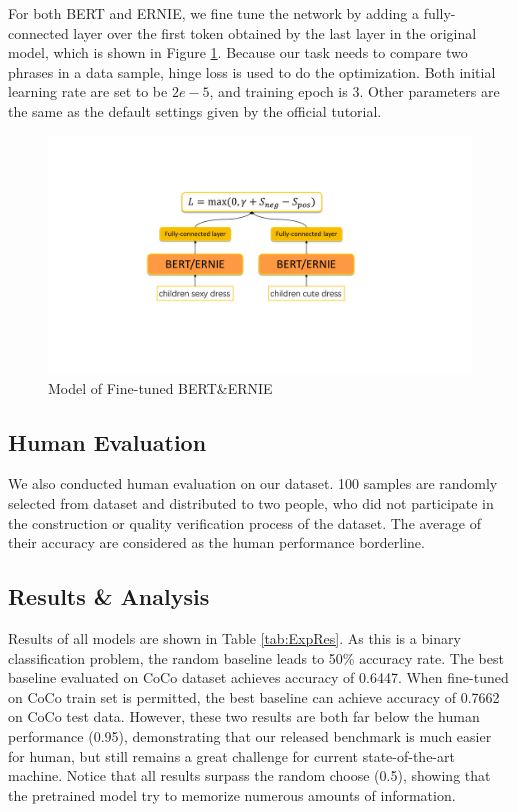 For both BERT and ERNIE, we fine tune the network by adding a fully-connected layer over the first token obtained by the last layer in the original model, which is shown in Figure \ref{fig:tuneNet}. Because our task needs to compare two phrases in a data sample, hinge loss is used to do the optimization. Both initial learning rate are set to be $2e-5$, and training epoch is 3. Other parameters are the same as the default settings given by the official tutorial.

\begin{figure}[h!]
	\centering
	\includegraphics[width=0.8\columnwidth]{images/fineTuneNetwork.pdf}
	\caption{Model of Fine-tuned BERT\&ERNIE}
	\label{fig:tuneNet}
\end{figure}


\subsection{Human Evaluation}
We also conducted human evaluation on our dataset. 100 samples are randomly selected from dataset and distributed to two people, who did not participate in the construction or quality verification process of the dataset. The average of their accuracy are considered as the human performance borderline. 




\subsection{Results \& Analysis}
Results of all models are shown in Table \ref{tab:ExpRes}. As this is a binary classification problem, the random baseline leads to 50\% accuracy rate. 
The best baseline evaluated on CoCo dataset achieves accuracy of 0.6447. When fine-tuned on CoCo train set is permitted, the best baseline can achieve accuracy of 0.7662 on CoCo test data. However, these two results are both far below the human performance (0.95), demonstrating that our released benchmark is much easier for human, but still remains a great challenge for current state-of-the-art machine. Notice that all results surpass the random choose (0.5), showing that the pretrained model %
try to memorize numerous amounts of information.

